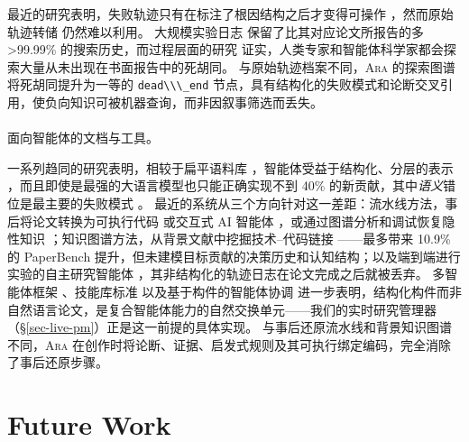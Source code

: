 \documentclass[
]{article}
\makeatletter
\let\oldparagraph\paragraph
\renewcommand{\paragraph}{
    \@ifstar
      \xxxParagraphStar
      \xxxParagraphNoStar
  }
\newcommand{\xxxParagraphStar}[1]{\oldparagraph*{#1}\mbox{}}
\newcommand{\xxxParagraphNoStar}[1]{\oldparagraph{#1}\mbox{}}
\newcommand{\passthrough}[1]{#1}
\theoremstyle{definition}
\newcommand{\ara}{\textsc{Ara}}
\makeatother
\begin{document}
最近的研究表明，失败轨迹只有在标注了根因结构之后才变得可操作
\citep{zhu2025agenterrorbench, zhang2025agentracer}，然而原始轨迹转储
\citep{yang2024sweagent} 仍然难以利用。 大规模实验日志
\citep{pinedaarango2021hpob, ying2019nasbench, gijsbers2019automl}
保留了比其对应论文所报告的多 \textgreater99.99\%
的搜索历史，而过程层面的研究
\citep{wijk2025rebench, yamada2025aiscientistv2}
证实，人类专家和智能体科学家都会探索大量从未出现在书面报告中的死胡同。
与原始轨迹档案不同，\ara{} 的探索图谱将死胡同提升为一等的
\passthrough{\lstinline!dead\\\_end!}
节点，具有结构化的失败模式和论断交叉引用，使负向知识可被机器查询，而非因叙事筛选而丢失。

\paragraph{面向智能体的文档与工具。}\label{ux9762ux5411ux667aux80fdux4f53ux7684ux6587ux6863ux4e0eux5de5ux5177}

一系列趋同的研究表明，相较于扁平语料库
\citep{lo2020s2orc, priem2022openalex}，智能体受益于结构化、分层的表示
\citep{openai2025agentsmd, vasilopoulos2026codifiedcontext}，而且即使是最强的大语言模型也只能正确实现不到
40\% 的新贡献，其中\emph{语义}错位是最主要的失败模式
\citep{jimenez2024swebench, chen2025scienceagentbench, hua2025researchcodebench}。
最近的系统从三个方向针对这一差距：流水线方法，事后将论文转换为可执行代码
\citep{seo2025papercoder} 或交互式 AI 智能体
\citep{miao2025paper2agent}，或通过图谱分析和调试恢复隐性知识
\citep{li2026tacit}；知识图谱方法，从背景文献中挖掘技术--代码链接
\citep{liu2026knowledgegraphs, luo2025xkg}------最多带来 10.9\% 的
PaperBench
提升，但未建模目标贡献的决策历史和认知结构；以及端到端进行实验的自主研究智能体
\citep{boiko2023coscientist, bran2024chemcrow, schmidgall2025agentlab, baek2025researchagent}，其非结构化的轨迹日志在论文完成之后就被丢弃。
多智能体框架 \citep{wu2024autogen}、技能库标准
\citep{wang2023voyager, agentskills2025} 以及基于构件的智能体协调
\citep{wang2026scienceclaw}
进一步表明，结构化构件而非自然语言论文，是复合智能体能力的自然交换单元------我们的实时研究管理器（\S\ref{sec-live-pm}）正是这一前提的具体实现。
与事后还原流水线和背景知识图谱不同，\ara{}
在创作时将论断、证据、启发式规则及其可执行绑定编码，完全消除了事后还原步骤。

\section{Future Work}\label{sec-discussion}
\end{document}
